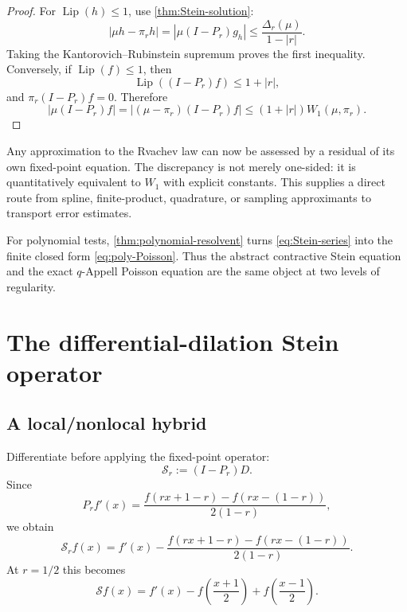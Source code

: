 \documentclass[11pt,a4paper]{article}
\theoremstyle{definition}
\theoremstyle{remark}
\newcommand{\Lip}{\operatorname{Lip}}
\newcommand{\Scal}{\mathcal S}
\begin{document}
\begin{proof}
For $\Lip(h)\le1$, use \cref{thm:Stein-solution}:
\[
 |\mu h-\pi_rh|
 =|\mu(I-P_r)g_h|
 \le\frac{\Delta_r(\mu)}{1-|r|}.
\]
Taking the Kantorovich--Rubinstein supremum proves the first inequality. Conversely, if $\Lip(f)\le1$, then
\[
 \Lip((I-P_r)f)\le1+|r|,
\]
and $\pi_r(I-P_r)f=0$. Therefore
\[
 |\mu(I-P_r)f|
 =|(\mu-\pi_r)(I-P_r)f|
 \le(1+|r|)W_1(\mu,\pi_r).
\]
\end{proof}

\begin{resultbox}
Any approximation to the Rvachev law can now be assessed by a residual of its own fixed-point equation. The discrepancy is not merely one-sided: it is quantitatively equivalent to $W_1$ with explicit constants. This supplies a direct route from spline, finite-product, quadrature, or sampling approximants to transport error estimates.
\end{resultbox}

For polynomial tests, \cref{thm:polynomial-resolvent} turns \eqref{eq:Stein-series} into the finite closed form \eqref{eq:poly-Poisson}. Thus the abstract contractive Stein equation and the exact $q$-Appell Poisson equation are the same object at two levels of regularity.

\section{The differential-dilation Stein operator}
\label{sec:differential-stein}

\subsection{A local/nonlocal hybrid}

Differentiate before applying the fixed-point operator:
\begin{equation}
 \Scal_r:=(I-P_r)D.
 \label{eq:S-general-def}
\end{equation}
Since
\begin{equation}
 P_rf'(x)=
 \frac{f(rx+1-r)-f(rx-(1-r))}{2(1-r)},
 \label{eq:Pr-derivative}
\end{equation}
we obtain
\begin{equation}
 \boxed{\displaystyle
 \Scal_rf(x)=f'(x)-
 \frac{f(rx+1-r)-f(rx-(1-r))}{2(1-r)}.}
 \label{eq:S-general}
\end{equation}
At $r=1/2$ this becomes
\begin{equation}
 \boxed{\displaystyle
 \Scal f(x)=f'(x)-f\!\left(\frac{x+1}{2}\right)
 +f\!\left(\frac{x-1}{2}\right).}
 \label{eq:S-dyadic}
\end{equation}
\end{document}
